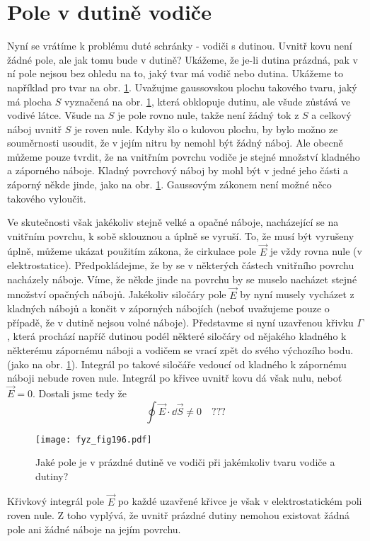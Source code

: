 \section{Pole v dutině vodiče}\label{fyz:IIchapVsecIX}
  Nyní se vrátíme k problému duté schránky - vodiči s dutinou. Uvnitř kovu není žádné pole, ale 
  jak tomu bude v dutině? Ukážeme, že je-li dutina prázdná, pak v ní pole nejsou bez ohledu na 
  to, jaký tvar má vodič nebo dutina. Ukážeme to například pro tvar na obr. \ref{fyz:fig196}. 
  Uvažujme gaussovskou plochu takového tvaru, jaký má plocha \(S\) vyznačená na obr. 
  \ref{fyz:fig196}, která obklopuje dutinu, ale všude zůstává ve vodivé látce. Všude na \(S\) je 
  pole rovno nule, takže není žádný tok z \(S\) a celkový náboj uvnitř \(S\) je roven nule. Kdyby 
  šlo o kulovou plochu, by bylo možno ze souměrnosti usoudit, že v jejím nitru by nemohl být žádný 
  náboj. Ale obecně můžeme pouze tvrdit, že na vnitřním povrchu vodiče je stejné množství kladného 
  a záporného náboje. Kladný povrchový náboj by mohl být v jedné jeho části a záporný někde jinde, 
  jako na obr. \ref{fyz:fig196}. Gaussovým zákonem není možné něco takového vyloučit.
  
  Ve skutečnosti však jakékoliv stejně velké a opačné náboje, nacházející se na vnitřním 
  povrchu, k sobě sklouznou a úplně se vyruší. To, že musí být vyrušeny úplně, můžeme ukázat 
  použitím zákona, že cirkulace pole \(\vec{E}\) je vždy rovna nule (v elektrostatice). 
  Předpokládejme, že by se v některých částech vnitřního povrchu nacházely náboje. Víme, že 
  někde jinde na povrchu by se muselo nacházet stejné množství  opačných nábojů. Jakékoliv 
  siločáry pole \(\vec{E}\) by nyní musely vycházet z kladných nábojů a končit v záporných 
  nábojích (neboť uvažujeme pouze o případě, že v dutině nejsou volné náboje). Představme si 
  nyní uzavřenou křivku \(\Gamma\), která prochází napříč dutinou podél některé siločáry od 
  nějakého kladného k některému zápornému náboji a vodičem se vrací zpět do svého výchozího 
  bodu. (jako na obr. \ref{fyz:fig196}). Integrál po takové siločáře vedoucí od kladného k 
  zápornému náboji nebude roven nule. Integrál po křivce uvnitř kovu dá však nulu, 
  neboť \(\vec{E}=0\). Dostali jsme tedy že
  \begin{equation}\label{fyz:eq_fey_elstat_gauss08}
    \oint \vec{E}\cdot\dd{\vec{S}} \neq 0  \quad ???
  \end{equation}

  \begin{figure}[ht!] %
    \centering
    \texttt{[image: fyz\_fig196.pdf]}
    \caption{Jaké pole je v prázdné dutině ve vodiči při jakémkoliv tvaru vodiče a dutiny?}
    \label{fyz:fig196}
  \end{figure}
  Křivkový integrál pole \(\vec{E}\) po každé uzavřené křivce je však v elektrostatickém poli 
  roven nule. Z toho vyplývá, že uvnitř prázdné dutiny nemohou existovat žádná pole ani žádné 
  náboje na jejím povrchu.
  
